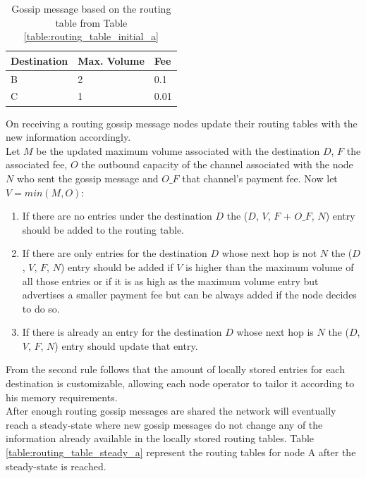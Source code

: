\begin{table}[H]
\centering
\begin{tabular}{|l|l|l|}
\hline
\rowcolor[HTML]{C0C0C0} 
Destination & Max. Volume   & Fee   \\ \hline
B           & 2             & 0.1   \\ \hline
C           & 1             & 0.01  \\ \hline
\end{tabular}
\caption{Gossip message based on the routing table from Table \ref{table:routing_table_initial_a}}
\label{table:routing_gossip}
\end{table}

On receiving a routing gossip message nodes update their routing tables with the new information accordingly. \\
Let $M$ be the updated maximum volume associated with the destination $D$, $F$ the associated fee, $O$ the outbound capacity of the channel associated with the node $N$ who sent the gossip message and $O\_F$ that channel's payment fee. Now let $V = min(M, O)$: \\

\begin{enumerate}

\item If there are no entries under the destination $D$ the ($D$, $V$, $F$ + $O\_F$, $N$) entry should be added to the routing table.
\item If there are only entries for the destination $D$ whose next hop is not $N$ the ($D$, $V$, $F$, $N$) entry should be added if $V$ is higher than the maximum volume of all those entries or if it is as high as the maximum volume entry but advertises a smaller payment fee but can be always added if the node decides to do so.
\item If there is already an entry for the destination $D$ whose next hop is $N$ the ($D$, $V$, $F$, $N$) entry should update that entry.

\end{enumerate}

From the second rule follows that the amount of locally stored entries for each destination is customizable, allowing each node operator to tailor it according to his memory requirements.\\
After enough routing gossip messages are shared the network will eventually reach a steady-state where new gossip messages do not change any of the information already available in the locally stored routing tables. Table \ref{table:routing_table_steady_a} represent the routing tables for node A after the steady-state is reached.

